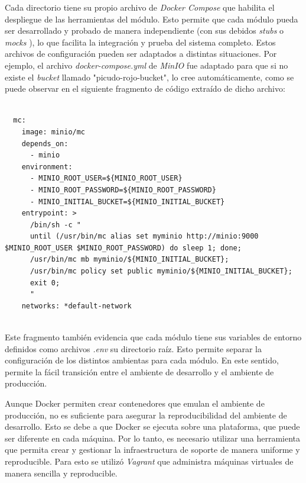 Cada directorio tiene su propio archivo de \textit{Docker Compose} que habilita el despliegue de las herramientas del módulo. Esto permite que cada módulo pueda ser desarrollado y probado de manera independiente (con sus debidos \textit{stubs} \citep{wikipedia_talon_2025} o \textit{mocks} \citep{wikipedia_objeto_2024}), lo que facilita la integración y prueba del sistema completo. Estos archivos de configuración pueden ser adaptados a distintas situaciones. Por ejemplo, el archivo \textit{docker-compose.yml} de \textit{MinIO} fue adaptado para que si no existe el \textit{bucket} llamado "picudo-rojo-bucket", lo cree automáticamente, como se puede observar en el siguiente fragmento de código extraído de dicho archivo:

\begin{lstlisting}[label=cod:minio-mc,caption=Configuración del servicio MinIO Client (mc).]  % Start your code-block
  
  mc:
    image: minio/mc
    depends_on:
      - minio
    environment:
      - MINIO_ROOT_USER=${MINIO_ROOT_USER}
      - MINIO_ROOT_PASSWORD=${MINIO_ROOT_PASSWORD}
      - MINIO_INITIAL_BUCKET=${MINIO_INITIAL_BUCKET}
    entrypoint: >
      /bin/sh -c "
      until (/usr/bin/mc alias set myminio http://minio:9000 $MINIO_ROOT_USER $MINIO_ROOT_PASSWORD) do sleep 1; done;
      /usr/bin/mc mb myminio/${MINIO_INITIAL_BUCKET};
      /usr/bin/mc policy set public myminio/${MINIO_INITIAL_BUCKET};
      exit 0;
      "
    networks: *default-network
    
\end{lstlisting}

Este fragmento también evidencia que cada módulo tiene sus variables de entorno definidos como archivos \textit{.env} su directorio raíz. Esto permite separar la configuración de los distintos ambientas para cada  módulo. En este sentido, permite la fácil transición entre el ambiente de desarrollo y el ambiente de producción.

Aunque Docker permiten crear contenedores que emulan el ambiente de producción, no es suficiente para asegurar la reproducibilidad del ambiente de desarrollo. Esto se debe a que Docker se ejecuta sobre una plataforma, que puede ser diferente en cada máquina. Por lo tanto, es necesario utilizar una herramienta que permita crear y gestionar la infraestructura de soporte de manera uniforme y reproducible. Para esto se utilizó \textit{Vagrant} que administra máquinas virtuales de manera sencilla y reproducible.

